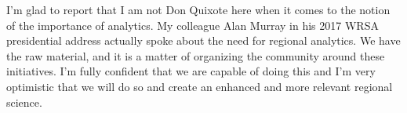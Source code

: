 \documentclass[11pt]{article}
\begin{document}
I'm glad to report that I am not Don Quixote here when it comes to the notion
of the importance of analytics. My colleague Alan Murray in his 2017 WRSA
presidential address \citep{Murray_2017_ars} actually spoke about the need for
regional analytics. We have the raw material, and it is a matter of organizing the
community around these initiatives. I'm fully confident that we are capable of doing
this and I'm very optimistic that we will do so and create an enhanced and
more relevant regional science.



\end{document}
